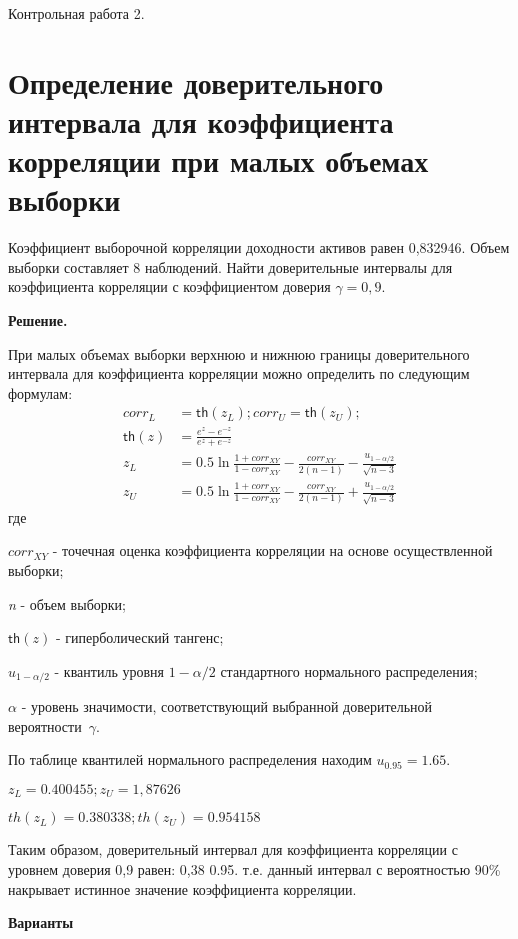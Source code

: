 \documentclass[12pt,a4paper]{article}
\begin{document}
\huge{Контрольная работа 2.}
\normalsize
\section{Определение доверительного интервала для коэффициента корреляции при малых объемах выборки}
\begin{taskrus}
Коэффициент выборочной корреляции доходности активов равен 0,832946. Объем выборки составляет 8 наблюдений. Найти доверительные интервалы для коэффициента корреляции с коэффициентом доверия $\gamma=0,9$. 

\textbf{Решение.}

При малых объемах выборки верхнюю и нижнюю границы доверительного интервала для коэффициента корреляции можно определить по следующим формулам:
\begin{align}
corr_L&=\mathsf{th}(z_L); corr_U=\mathsf{th}(z_U);\\
\mathsf{th}(z)&=\frac{e^z-e^{-z}}{e^z+e^{-z}}\\
z_L&=0.5\ln \frac{1+corr_{XY}}{1-corr_{XY}}-\frac{corr_{XY}}{2(n-1)}-\frac{u_{1-\alpha/2}}{\sqrt{n-3}}
\\
z_U&=0.5\ln \frac{1+corr_{XY}}{1-corr_{XY}}-\frac{corr_{XY}}{2(n-1)}+\frac{u_{1-\alpha/2}}{\sqrt{n-3}}
\end{align}
где

$corr_{XY}$ - точечная оценка коэффициента корреляции на основе осуществленной выборки;

\textit{n} - объем выборки;

$\mathsf{th}(z)$ - гиперболический тангенс;

$u_{1-\alpha/2}$ - квантиль уровня $1-\alpha/2$ стандартного нормального распределения;

$\alpha$ - уровень значимости, соответствующий выбранной доверительной вероятности~$\gamma$.

По таблице квантилей нормального распределения находим $u_{0.95}=1.65$.

$z_L=0.400455; z_U=1,87626$

$th(z_L)=0.380338; th(z_U)=0.954158$

Таким образом, доверительный интервал для коэффициента корреляции с уровнем доверия 0,9 равен: 0,38 0.95. т.е. данный интервал с вероятностью 90\% накрывает истинное значение коэффициента корреляции.

\textbf{Варианты}


\end{taskrus}
\end{document}
